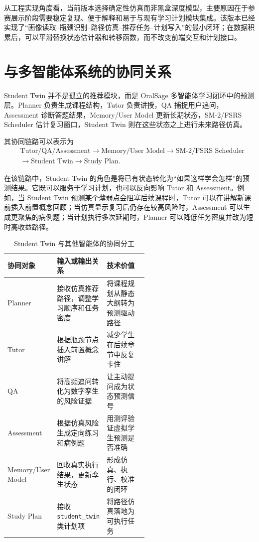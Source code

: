 从工程实现角度看，当前版本选择确定性仿真而非黑盒深度模型，主要原因在于参赛展示阶段需要稳定复现、便于解释和易于与现有学习计划模块集成。该版本已经实现了“画像读取--瓶颈识别--路径仿真--推荐任务--计划写入”的最小闭环；在数据积累后，可以平滑替换状态估计器和转移函数，而不改变前端交互和计划接口。

\section{与多智能体系统的协同关系}

Student Twin 并不是孤立的推荐模块，而是 OralSage 多智能体学习闭环中的预测层。Planner 负责生成课程结构，Tutor 负责讲授，QA 捕捉用户追问，Assessment 诊断答题结果，Memory/User Model 更新长期状态，SM-2/FSRS Scheduler 估计复习窗口，Student Twin 则在这些状态之上进行未来路径仿真。

其协同链路可以表示为
\[
\begin{aligned}
&\text{Tutor/QA/Assessment}
\rightarrow
\text{Memory/User Model}
\rightarrow
\text{SM-2/FSRS Scheduler}
\\
&\rightarrow
\text{Student Twin}
\rightarrow
\text{Study Plan}.
\end{aligned}
\]

在该链路中，Student Twin 的角色是将已有状态转化为“如果这样学会怎样”的预测结果。它既可以服务于学习计划，也可以反向影响 Tutor 和 Assessment。例如，当 Student Twin 预测某个薄弱点会阻塞后续课程时，Tutor 可以在讲解新课前插入前置概念回顾；当仿真显示复习后仍存在较高风险时，Assessment 可以生成更聚焦的病例题；当计划执行多次延期时，Planner 可以降低任务密度并改为短时高收益路径。

\begin{table}[H]
  \centering
  \caption{Student Twin 与其他智能体的协同分工}
  \label{tab:student-twin-agent-collaboration}
  \begin{tabularx}{\linewidth}{p{0.22\linewidth}p{0.34\linewidth}X}
    \toprule
    协同对象 & 输入或输出关系 & 技术价值 \\
    \midrule
    Planner & 接收仿真推荐路径，调整学习顺序和任务密度 & 将课程规划从静态大纲转为预测驱动路径 \\
    Tutor & 根据瓶颈节点插入前置概念讲解 & 减少学生在后续章节中反复卡住 \\
    QA & 将高频追问转化为数字孪生的风险证据 & 让主动提问成为状态预测信号 \\
    Assessment & 根据仿真风险生成定向练习和病例题 & 用测评验证虚拟学生预测是否准确 \\
    Memory/User Model & 回收真实执行结果，更新孪生状态 & 形成仿真、执行、校准的闭环 \\
    Study Plan & 接收 \texttt{student\_twin} 类计划项 & 将路径仿真落地为可执行任务 \\
    \bottomrule
  \end{tabularx}
\end{table}

